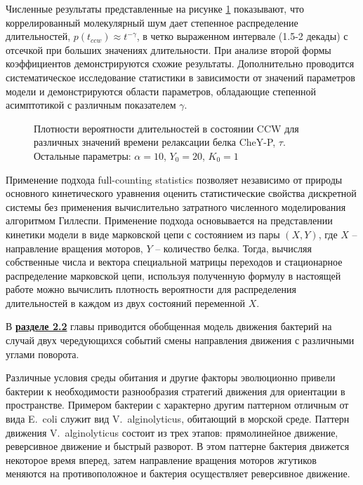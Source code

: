Численные результаты представленные на рисунке \cref{fig:duration-pdf} показывают, что коррелированный молекулярный шум дает степенное распределение длительностей, $p(t_{ccw}) \approx t^{-\gamma}$, в четко выраженном интервале (1.5-2 декады) с отсечкой при больших значениях длительности. При анализе второй формы коэффициентов демонстрируются схожие результаты. Дополнительно проводится систематическое исследование статистики в зависимости от значений параметров модели и демонстрируются области параметров, обладающие степенной асимптотикой с различным показателем $\gamma$.

\begin{figure}[ht]
    \caption{
        Плотности вероятности длительностей в состоянии CCW для различных значений времени релаксации белка CheY-P, $\tau$. Остальные параметры: $\alpha = 10$, $Y_0 = 20$, $K_0 = 1$
    }
    \label{fig:duration-pdf}
\end{figure}

Применение подхода full-counting statistics позволяет независимо от природы основного кинетического уравнения оценить статистические свойства дискретной системы без применения вычислительно затратного численного моделирования алгоритмом Гиллеспи. Применение подхода основывается на представлении кинетики модели в виде марковской цепи с состоянием из пары $(X,Y)$, где $X$ -- направление вращения моторов, $Y$ -- количество белка. Тогда, вычисляя собственные числа и вектора специальной матрицы переходов и стационарное распределение марковской цепи, используя полученную формулу в настоящей работе можно вычислить плотность вероятности для распределения длительностей в каждом из двух состояний переменной $X$. 

В \underline{\textbf{разделе 2.2}} главы приводится обобщенная модель движения бактерий на случай двух чередующихся событий смены направления движения с различными углами поворота. 

Различные условия среды обитания и другие факторы эволюционно привели бактерии к необходимости разнообразия стратегий движения для ориентации в пространстве. Примером бактерии с характерно другим паттерном отличным от вида E.~coli служит вид V.~alginolyticus, обитающий в морской среде. Паттерн движения V.~alginolyticus состоит из трех этапов: прямолинейное движение, реверсивное движение и быстрый разворот. В этом паттерне бактерия движется некоторое время вперед, затем направление вращения моторов жгутиков меняются на противоположное и бактерия осуществляет реверсивное движение. 

